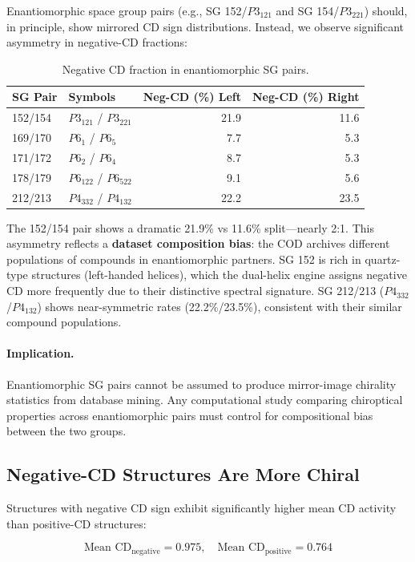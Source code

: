 \documentclass[11pt,a4paper]{article}
\begin{document}
Enantiomorphic space group pairs (e.g., SG 152/$P3_121$ and SG 154/$P3_221$) should, in principle, show mirrored CD sign distributions. Instead, we observe significant asymmetry in negative-CD fractions:

\begin{table}[H]
\centering
\caption{Negative CD fraction in enantiomorphic SG pairs.}
\label{tab:enantio}
\begin{tabular}{llrr}
\toprule
SG Pair & Symbols & Neg-CD (\%) Left & Neg-CD (\%) Right \\
\midrule
152/154 & $P3_121$ / $P3_221$ & 21.9 & 11.6 \\
169/170 & $P6_1$ / $P6_5$ & 7.7 & 5.3 \\
171/172 & $P6_2$ / $P6_4$ & 8.7 & 5.3 \\
178/179 & $P6_122$ / $P6_522$ & 9.1 & 5.6 \\
212/213 & $P4_332$ / $P4_132$ & 22.2 & 23.5 \\
\bottomrule
\end{tabular}
\end{table}

\noindent The 152/154 pair shows a dramatic 21.9\% vs 11.6\% split---nearly 2:1. This asymmetry reflects a \textbf{dataset composition bias}: the COD archives different populations of compounds in enantiomorphic partners. SG 152 is rich in quartz-type structures (left-handed helices), which the dual-helix engine assigns negative CD more frequently due to their distinctive spectral signature. SG 212/213 ($P4_332$/$P4_132$) shows near-symmetric rates (22.2\%/23.5\%), consistent with their similar compound populations.

\paragraph{Implication.} Enantiomorphic SG pairs cannot be assumed to produce mirror-image chirality statistics from database mining. Any computational study comparing chiroptical properties across enantiomorphic pairs must control for compositional bias between the two groups.

\subsection{Negative-CD Structures Are More Chiral}

Structures with negative CD sign exhibit significantly higher mean CD activity than positive-CD structures:

\begin{equation}
\text{Mean CD}_{\text{negative}} = 0.975, \quad \text{Mean CD}_{\text{positive}} = 0.764
\end{equation}
\end{document}

